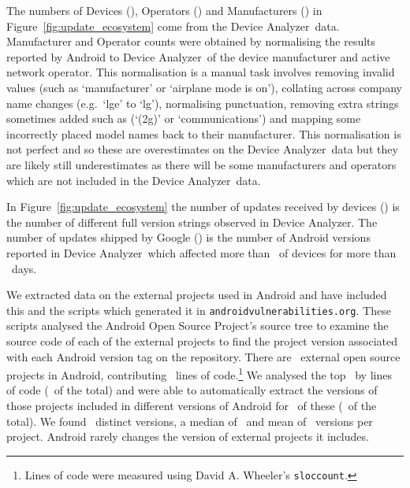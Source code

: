 \documentclass[conference,a4paper,twoside]{IEEEtran}
\let\OldTodo\todo
\renewcommand{\todo}{\OldTodo[inline]}
\newcommand{\todolater}[1]{}%
\newcommand{\da}{Device Analyzer}
\newcommand{\avo}{\texttt{androidvulnerabilities.org}}
\begin{document}
The numbers of Devices (\daNumOSDevices), Operators (\daNumOperators) and Manufacturers (\daNumManufacturers) in Figure~\ref{fig:update_ecosystem} come from the \da\ data.
Manufacturer and Operator counts were obtained by normalising the results reported by Android to \da\ of the device manufacturer and active network operator.
This normalisation is a manual task involves removing invalid values (such as `manufacturer' or `airplane mode is on'), collating across company name changes (e.g.\ `lge' to `lg'), normalising punctuation, removing extra strings sometimes added such as (`(2g)' or `communications') and mapping some incorrectly placed model names back to their manufacturer.
This normalisation is not perfect and so these are overestimates on the \da\ data but they are likely still underestimates as there will be some manufacturers and operators which are not included in the \da\ data.

In Figure~\ref{fig:update_ecosystem} the number of updates received by devices (\daNumFullVersions) is the number of different full version strings observed in \da.
The number of updates shipped by Google (\daNumSigOSVersions) is the number of Android versions reported in \da\ which affected more than \daSigVersionPerc\ of devices for more than \daSigVersionDays\ days. \todolater{this is the wrong number to be using}

We extracted data on the external projects used in Android and have included this and the scripts which generated it in \avo.
These scripts analysed the Android Open Source Project's source tree to examine the source code of each of the external projects to find the project version associated with each Android version tag on the repository.
There are \avoNumExternalProjects\ external open source projects in Android, contributing \avoTotalExternalLines\ lines of code.\footnote{Lines of code were measured using David A. Wheeler's \texttt{sloccount}.}
We analysed the top \avoNumBigExternalProjects\ by lines of code (\avoBigExternalLinesOfCodePerc\ of the total) and were able to automatically extract the versions of those projects included in different versions of Android for \avoNumAnalysedExternalProjects\ of these (\avoAnalysedExternalLinesOfCodePerc\ of the total).
We found \avoBigExternalTotalVersions\ distinct versions, a median of \avoBigExternalMedianVersions\ and mean of \avoBigExternalMeanVersions\ versions per project.
Android rarely changes the version of external projects it includes.
\end{document}
